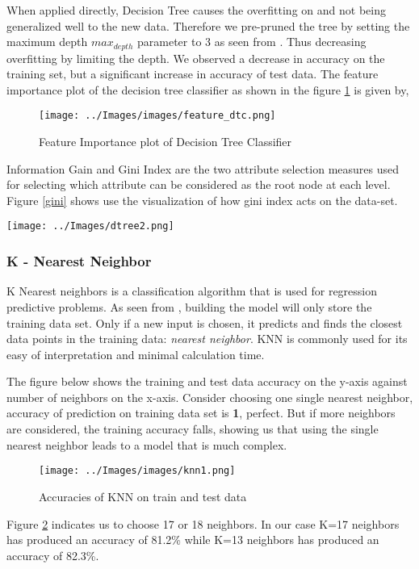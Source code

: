 \documentclass[conference]{IEEEtran}
\begin{document}
When applied directly, Decision Tree causes the overfitting on \cite{monoclonal1} and not being generalized well to the new data. Therefore we pre-pruned the tree by setting the maximum depth $max_{depth}$ parameter to 3 as seen from \cite{dt}. Thus decreasing overfitting by limiting the depth. We observed a decrease in accuracy on the training set, but a significant increase in accuracy of test data. The feature importance plot of the decision tree classifier as shown in the figure \ref{feature_dtc} is given by,

\begin{figure}[h!]
	\centering
	\texttt{[image: ../Images/images/feature\_dtc.png]}
	\caption{Feature Importance plot of Decision Tree Classifier}	
	\label{feature_dtc}
\end{figure}
Information Gain and Gini Index are the two attribute selection measures used for selecting which attribute can be considered as the root node at each level. Figure \ref{gini} shows use the visualization of how gini index acts on the data-set.

\begin{figure*}[h!]
	\centering
	\texttt{[image: ../Images/dtree2.png]}
	\caption{Visualization of Decision Tree Classifier using the gini index selection measure}	
	\label{gini}
\end{figure*}

\subsubsection*{K - Nearest Neighbor}
K Nearest neighbors is a classification algorithm that is used for regression predictive problems. As seen from \cite{knn}, building the model will only store the training data set. Only if a new input is chosen, it predicts and finds the closest data points in the training data: \textit{nearest neighbor}. KNN is commonly used for its easy of interpretation and minimal calculation time.
\par
The figure below shows the training and test data accuracy on the y-axis against number of neighbors on the x-axis. Consider choosing one single nearest neighbor, accuracy of prediction on training data set is \textbf{1}, perfect. But if more neighbors are considered, the training accuracy falls, showing us that using the single nearest neighbor leads to a model that is much complex.


\begin{figure}[h!]
	\centering
	\texttt{[image: ../Images/images/knn1.png]}
	\caption{Accuracies of KNN on train and test data}
	\label{fig:knn}
\end{figure}
\par
Figure \ref{fig:knn} indicates us to choose 17 or 18 neighbors. In our case K=17 neighbors has produced an accuracy of 81.2\% while K=13 neighbors has produced an accuracy of 82.3\%.
\end{document}
